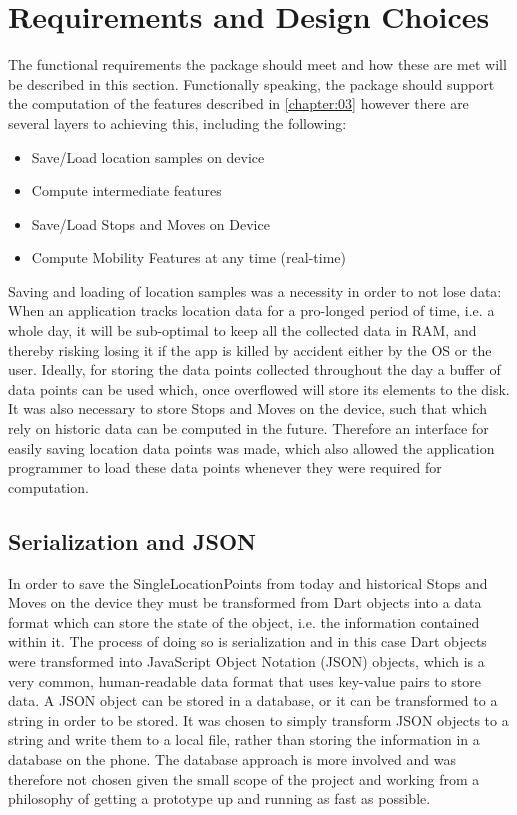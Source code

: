 \section{Requirements and Design Choices}
The functional requirements the package should meet and how these are met will be described in this section. Functionally speaking, the package should support the computation of the features described in \ref{chapter:03} however there are several layers to achieving this, including the following:

\begin{itemize}
    \item Save/Load location samples on device
    \item Compute intermediate features
    \item Save/Load Stops and Moves on Device
    \item Compute Mobility Features at any time (real-time)
\end{itemize}

Saving and loading of location samples was a necessity in order to not lose data: When an application tracks location data for a pro-longed period of time, i.e. a whole day, it will be sub-optimal to keep all the collected data in RAM, and thereby risking losing it if the app is killed by accident either by the OS or the user. Ideally, for storing the data points collected throughout the day a buffer of data points can be used which, once overflowed will store its elements to the disk. It was also necessary to store Stops and Moves on the device, such that which rely on historic data can be computed in the future. Therefore an interface for easily saving location data points was made, which also allowed the application programmer to load these data points whenever they were required for computation. 

\subsection{Serialization and JSON}
In order to save the SingleLocationPoints from today and historical Stops and Moves on the device they must be transformed from Dart objects into a data format which can store the state of the object, i.e. the information contained within it. The process of doing so is serialization and in this case Dart objects were transformed into JavaScript Object Notation (JSON) objects, which is a very common, human-readable data format that uses key-value pairs to store data. A JSON object can be stored in a database, or it can be transformed to a string in order to be stored. It was chosen to simply transform JSON objects to a string and write them to a local file, rather than storing the information in a database on the phone. The database approach is more involved and was therefore not chosen given the small scope of the project and working from a philosophy of getting a prototype up and running as fast as possible.

